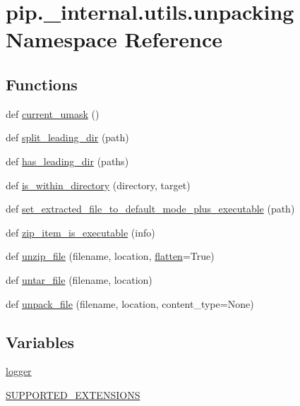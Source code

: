 \hypertarget{namespacepip_1_1__internal_1_1utils_1_1unpacking}{}\section{pip.\+\_\+internal.\+utils.\+unpacking Namespace Reference}
\label{namespacepip_1_1__internal_1_1utils_1_1unpacking}
\subsection*{Functions}
\begin{DoxyCompactItemize}
\item 
def \hyperlink{namespacepip_1_1__internal_1_1utils_1_1unpacking_a6dd9757f268ca7738e456b81fea6b8d0}{current\+\_\+umask} ()
\item 
def \hyperlink{namespacepip_1_1__internal_1_1utils_1_1unpacking_a2ab7a0113a82a18150c48158f8a80cb2}{split\+\_\+leading\+\_\+dir} (path)
\item 
def \hyperlink{namespacepip_1_1__internal_1_1utils_1_1unpacking_a48f899e2c4e1caada411b7681202380d}{has\+\_\+leading\+\_\+dir} (paths)
\item 
def \hyperlink{namespacepip_1_1__internal_1_1utils_1_1unpacking_a7fa6fd1203599fea3464f86d65866d71}{is\+\_\+within\+\_\+directory} (directory, target)
\item 
def \hyperlink{namespacepip_1_1__internal_1_1utils_1_1unpacking_a90a6ff776b7d910535c138c11eb22428}{set\+\_\+extracted\+\_\+file\+\_\+to\+\_\+default\+\_\+mode\+\_\+plus\+\_\+executable} (path)
\item 
def \hyperlink{namespacepip_1_1__internal_1_1utils_1_1unpacking_adbe68be28fbb02223e62d18869c3e0fb}{zip\+\_\+item\+\_\+is\+\_\+executable} (info)
\item 
def \hyperlink{namespacepip_1_1__internal_1_1utils_1_1unpacking_ac680d7976163e5e647a0e14958948bed}{unzip\+\_\+file} (filename, location, \hyperlink{size_2foo_8f90_a5b6fedc75d027f2d0e1cea960deeec4e}{flatten}=True)
\item 
def \hyperlink{namespacepip_1_1__internal_1_1utils_1_1unpacking_a5acf8cffa33829350a298940743e4087}{untar\+\_\+file} (filename, location)
\item 
def \hyperlink{namespacepip_1_1__internal_1_1utils_1_1unpacking_aeef866b94a84eeb722a39d15afdea530}{unpack\+\_\+file} (filename, location, content\+\_\+type=None)
\end{DoxyCompactItemize}
\subsection*{Variables}
\begin{DoxyCompactItemize}
\item 
\hyperlink{namespacepip_1_1__internal_1_1utils_1_1unpacking_ab665e7a32bc6ae5cd73faa4d9990f820}{logger}
\item 
\hyperlink{namespacepip_1_1__internal_1_1utils_1_1unpacking_a134a634aafbed500d5cb183a1fa6eec8}{S\+U\+P\+P\+O\+R\+T\+E\+D\+\_\+\+E\+X\+T\+E\+N\+S\+I\+O\+NS}
\end{DoxyCompactItemize}


